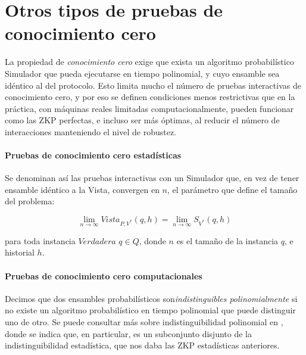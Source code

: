 \section{Otros tipos de pruebas de conocimiento cero}

La propiedad de \textit{conocimiento cero} exige que exista un algoritmo probabilístico Simulador que pueda ejecutarse en tiempo polinomial, y cuyo ensamble sea idéntico al del protocolo. Esto limita mucho el número de pruebas interactivas de conocimiento cero, y por eso se definen condiciones menos restrictivas que en la práctica, con máquinas reales limitadas computacionalmente, pueden funcionar como las ZKP perfectas, e incluso ser más óptimas, al reducir el número de interacciones manteniendo el nivel de robustez.

\hfil

\paragraph{Pruebas de conocimiento cero estadísticas}

\hfil

Se denominan así las pruebas interactivas con un Simulador que, en vez de tener ensamble idéntico a la Vista, convergen en $n$, el parámetro que define el tamaño del problema:

\begin{center}
	$$
	\lim_{n\to\infty} Vista_{P,V^*}(q,h) =  \lim_{n\to\infty} S_{V^*}(q,h)
	$$
\end{center}

para toda instancia $Verdadera$ $q\in Q$, donde $n$ es el tamaño de la instancia $q$, e historial $h$. 

\hfil


\paragraph{Pruebas de conocimiento cero computacionales}

\hfil

Decimos que dos ensambles probabilísticos son\textit{indistinguibles polinomialmente} si no existe un algoritmo probabilístico en tiempo polinomial que puede distinguir uno de otro. Se puede consultar más sobre indistinguibilidad polinomial en \citep{book:856771}, donde se indica que, en particular, es un subconjunto disjunto de la indistinguibilidad estadística, que nos daba las ZKP estadísticas anteriores.

\hfil

